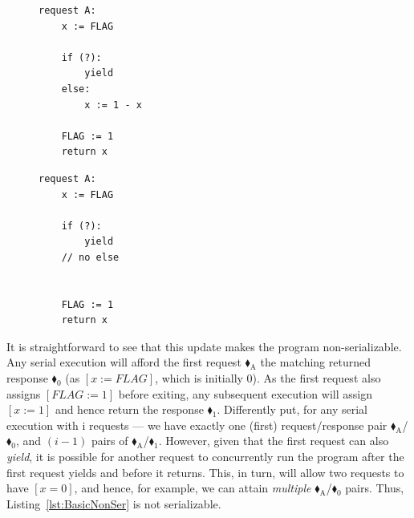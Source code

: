 %
\begin{figure}
	\centering
	\begin{minipage}[t]{0.29\textwidth}
		\begin{lstlisting}[caption={Serializable},label={lst:BasicSer},numbers=none]
request A: 
    x := FLAG

    if (?):
        yield
    else:
        x := 1 - x

    FLAG := 1
    return x
		\end{lstlisting}
	\end{minipage}\hspace{1.2em}%
	\begin{minipage}[t]{0.29\textwidth}
		\begin{lstlisting}[caption={Not serializable},label={lst:BasicNonSer},numbers=none]
request A: 
    x := FLAG 

    if (?): 
        yield
    // no else


    FLAG := 1 
    return x
		\end{lstlisting}
	\end{minipage}
	\vspace{-1\intextsep} %
\end{figure}
It is straightforward to see that this update makes the program non-serializable. Any serial execution will afford the first request {\color{ForestGreen}$\blacklozenge_\text{A}$} the matching returned response {\color{red}$\blacklozenge_0$} (as $[x:=FLAG]$, which is initially 0). As the first request also assigns $[FLAG:=1]$ before exiting, any subsequent execution will assign $[x:=1]$ and hence return the response {\color{red}$\blacklozenge_1$}. 
%
Differently put, for any serial execution with i requests --- we have exactly one (first) request/response pair {\color{ForestGreen}$\blacklozenge_\text{A}$}/{\color{red}$\blacklozenge_0$}, and $(i-1)$ pairs of {\color{ForestGreen}$\blacklozenge_\text{A}$}/{\color{red}$\blacklozenge_1$}.
%
However, given that the first request can also \textit{yield}, it is possible for another request to concurrently run the program after the first request yields and before it returns. This, in turn, will allow two requests to have $[x=0]$, and hence, for example, we can attain \textit{multiple} {\color{ForestGreen}$\blacklozenge_\text{A}$}/{\color{red}$\blacklozenge_0$} pairs. Thus, Listing~\ref{lst:BasicNonSer} is not serializable.
